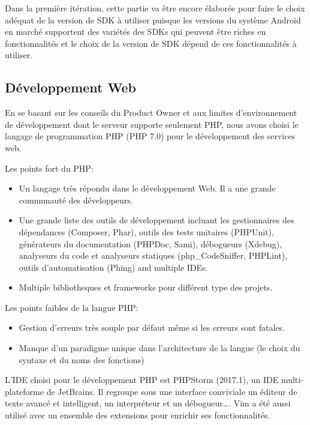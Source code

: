 Dans la première itération, cette partie va être encore élaborée pour faire le
choix adéquat de la version de SDK à utiliser puisque les versions du système
Android en marché supportent des variétés des SDKs qui peuvent être riches en
fonctionnalités et le choix de la version de SDK dépend de ces fonctionnalités
à utiliser.

\subsection{Développement Web}

En se basant sur les conseils du Product Owner et aux limites d'environnement
de développement dont le serveur supporte seulement PHP, nous avons choisi le
langage de programmation PHP (PHP 7.0) pour le développement des services web.

Les points fort du PHP:

\begin{itemize}
    \item Un langage très répondu dans le développement Web. Il a une
        grande communauté des développeurs.
    \item Une grande liste des outils de développement incluant les
        gestionnaires des dépendances (Composer, Phar), outils des tests
        unitaires (PHPUnit), générateurs du documentation (PHPDoc, Sami),
        débogueurs (Xdebug), analyseurs du code et analyseurs statiques
        (php\_CodeSniffer, PHPLint), outils d'automatisation (Phing) and
        multiple IDEs.
    \item Multiple bibliotheques et frameworks pour différent type des projets.
\end{itemize}

Les points faibles de la langue PHP:

\begin{itemize}
    \item Gestion d'erreurs très souple par défaut même si les erreurs sont
        fatales.
    \item Manque d'un paradigme unique dans l'architecture de la langue (le
        choix du syntaxe et du noms des fonctions)
\end{itemize}

L'IDE choisi pour le développement PHP est PHPStorm (2017.1), un IDE
multi-plateforme de JetBrains. Il regroupe sous une interface conviviale un
éditeur de texte avancé et intelligent, un interpréteur et un débogueur\ldots.
Vim a été aussi utilisé avec un ensemble des extensions pour enrichir ses
fonctionnalités.

